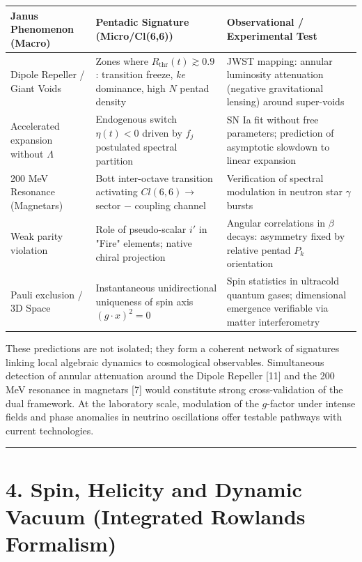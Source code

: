 \documentclass[11pt]{article}
\begin{document}
\begin{table}[H]
\centering
\small
\begin{tabularx}{\textwidth}{@{}XXX@{}}
\toprule
Janus Phenomenon (Macro) & Pentadic Signature (Micro/Cl(6,6)) & Observational / Experimental Test \\
\midrule
Dipole Repeller / Giant Voids & Zones where $R_{\text{thr}}(t) \gtrsim 0.9$: transition freeze, \textit{ke} dominance, high $N$ pentad density & JWST mapping: annular luminosity attenuation (negative gravitational lensing) around super-voids \\
Accelerated expansion without $\Lambda$ & Endogenous switch $\eta(t) < 0$ driven by $f_j$ postulated spectral partition & SN Ia fit without free parameters; prediction of asymptotic slowdown to linear expansion \\
200 MeV Resonance (Magnetars) & Bott inter-octave transition activating $Cl(6,6) \to$ sector $-$ coupling channel & Verification of spectral modulation in neutron star $\gamma$ bursts \\
Weak parity violation & Role of pseudo-scalar $i'$ in "Fire" elements; native chiral projection & Angular correlations in $\beta$ decays: asymmetry fixed by relative pentad $P_k$ orientation \\
Pauli exclusion / 3D Space & Instantaneous unidirectional uniqueness of spin axis $(g\cdot x)^2=0$ & Spin statistics in ultracold quantum gases; dimensional emergence verifiable via matter interferometry \\
\bottomrule
\end{tabularx}
\end{table}

These predictions are not isolated; they form a coherent network of
signatures linking local algebraic dynamics to cosmological observables.
Simultaneous detection of annular attenuation around the Dipole Repeller
{[}11{]} and the 200 MeV resonance in magnetars {[}7{]} would constitute
strong cross-validation of the dual framework. At the laboratory scale,
modulation of the \(g\)-factor under intense fields and phase anomalies
in neutrino oscillations offer testable pathways with current
technologies.

\begin{center}\rule{0.5\linewidth}{0.5pt}\end{center}

\hypertarget{spin-helicity-and-dynamic-vacuum-integrated-rowlands-formalism}{%
\section{4. Spin, Helicity and Dynamic Vacuum (Integrated Rowlands
Formalism)}\label{spin-helicity-and-dynamic-vacuum-integrated-rowlands-formalism}}
\end{document}
